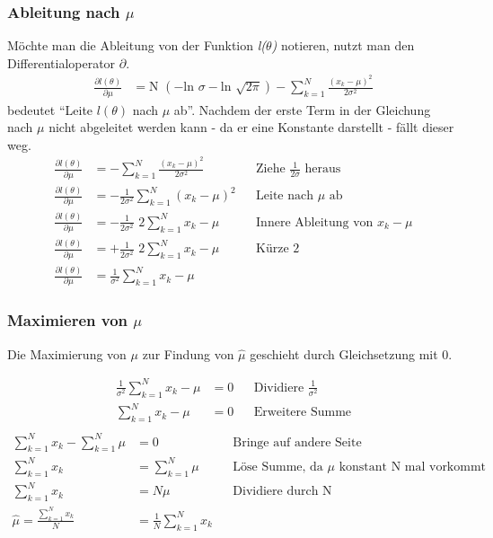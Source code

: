 \subsubsection*{Ableitung nach $\mu$}
Möchte man die Ableitung von der Funktion \textit{l($\theta$)} notieren, nutzt man den Differentialoperator $\partial$.
\begin{align*}
	\frac{\partial l(\theta)}{\partial \mu} &= \text{N } (- \text{ln }\sigma - \text{ln }\sqrt{2\pi}) - \sum_{k=1}^N {\frac{(x_k-\mu)^2}{2\sigma^2}}
\end{align*}
bedeutet ``Leite $l(\theta)$ nach $\mu$ ab''. Nachdem der erste Term in der Gleichung nach $\mu$ nicht abgeleitet werden kann - da er eine Konstante darstellt - fällt dieser weg.
\begin{align*}
	\frac{\partial l(\theta)}{\partial \mu} &= - \sum_{k=1}^N {\frac{(x_k-\mu)^2}{2\sigma^2}} && \text{Ziehe $\frac{1}{2\sigma}$ heraus}\\
	\frac{\partial l(\theta)}{\partial \mu} &= - \frac{1}{2\sigma^2}\sum_{k=1}^N (x_k-\mu)^2 && \text{Leite nach $\mu$ ab}\\
	\frac{\partial l(\theta)}{\partial \mu} &= - \frac{1}{2\sigma^2}\text{ 2}\sum_{k=1}^N x_k-\mu && \text{Innere Ableitung von $x_k-\mu$}\\
	\frac{\partial l(\theta)}{\partial \mu} &= + \frac{1}{2\sigma^2}\text{ 2}\sum_{k=1}^N x_k-\mu && \text{Kürze 2}\\
	\frac{\partial l(\theta)}{\partial \mu} &= \frac{1}{\sigma^2}\sum_{k=1}^N x_k-\mu
\end{align*}

\subsubsection*{Maximieren von $\mu$}
Die Maximierung von $\mu$ zur Findung von $\hat\mu$ geschieht durch Gleichsetzung mit 0.

\begin{align*}
	\frac{1}{\sigma^2}\sum_{k=1}^N x_k-\mu &= 0 && \text{Dividiere $\frac{1}{\sigma^2}$}\\
	\sum_{k=1}^N x_k-\mu &= 0 && \text{Erweitere Summe}\\
\end{align*}
\begin{align*}
	\sum_{k=1}^N x_k - \sum_{k=1}^N\mu &= 0 && \text{Bringe auf andere Seite}\\
	\sum_{k=1}^N x_k &= \sum_{k=1}^N\mu && \text{Löse Summe, da $\mu$ konstant N mal vorkommt}\\
	\sum_{k=1}^N x_k &= N\mu && \text{Dividiere durch N}\\
	\hat\mu = \frac{\sum_{k=1}^N x_k}{N} &= \frac{1}{N}\sum_{k=1}^N x_k
\end{align*}

